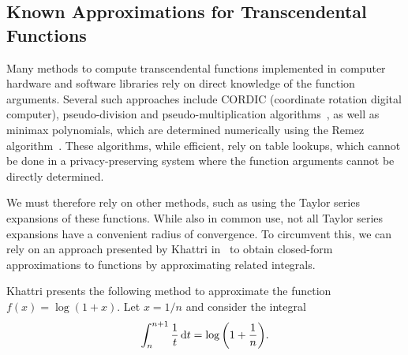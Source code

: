 \subsection{Known Approximations for Transcendental Functions}
Many methods to compute transcendental functions implemented in computer hardware and software libraries rely on direct knowledge of the function arguments. Several such approaches include CORDIC (coordinate rotation digital computer), pseudo-division and pseudo-multiplication algorithms~\cite{walther_cordic_2000}, as well as minimax polynomials, which are determined numerically using the Remez algorithm~\cite{harrison_computation_1999}. These algorithms, while efficient, rely on table lookups, which cannot be done in a privacy-preserving system where the function arguments cannot be directly determined.

We must therefore rely on other methods, such as using the Taylor series expansions of these functions. While also in common use, not all Taylor series expansions have a convenient radius of convergence. To circumvent this, we can rely on an approach presented by Khattri in~\cite{khattri_new_2009} to obtain closed-form approximations to functions by approximating related integrals.

Khattri presents the following method to approximate the function $f(x)=\log\left(1+x\right)$.
Let $x = 1/n$ and consider the integral
\begin{align}
	\label{eq:log_integral}
	\int_{n}^{n+1}{\frac{1}{t}\mathop{}\!\mathrm{d} t}=\log{\left(1+\frac{1}{n}\right)}.
\end{align}

